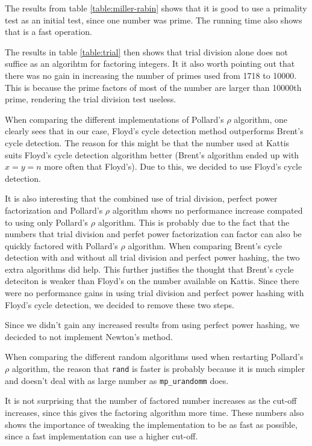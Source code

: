 The results from table \ref{table:miller-rabin} shows that it is good to use 
a primality test as an initial test, since one number was prime.
The running time also shows that is a fast operation.

The results in table \ref{table:trial} then shows that trial division alone 
does not suffice as an algorihtm for factoring integers. It it also worth
pointing out that there was no gain in increasing the number of primes used from
1718 to 10000. This is because the prime factors of most of the number are
larger than 10000th prime, rendering the trial division test useless.

When comparing the different implementations of Pollard's $\rho$ algorithm, one
clearly sees that in our case, Floyd's cycle detection method outperforms
Brent's cycle detection. The reason for this might be that the number used at
Kattis suits Floyd's cycle detection algorithm better (Brent's algorithm ended
up with $x = y = n$ more often that Floyd's). Due to this, we decided to use
Floyd's cycle detection. 

It is also interesting that the combined use of trial
division, perfect power factorization and Pollard's $\rho$ algorithm shows no
performance increase compated to using only Pollard's $\rho$ algorithm.
This is probably due to the fact that the numbers that trial division and
perfet power factorization can factor can also be quickly factored with
Pollard's $\rho$ algorithm. When comparing
Brent's cycle detection with and without all trial division and perfect power
hashing, the two extra algorithms did help. This further justifies the thought
that Brent's cycle deteciton is weaker than Floyd's on the number available on
Kattis. Since there were no performance gains in using trial division and
perfect power hashing with Floyd's cycle detection, we decided to remove these
two steps.

Since we didn't gain any increased results from using perfect power hashing, 
we decicded to not implement Newton's method.

When comparing the different random algorithms used when restarting Pollard's
$\rho$ algorithm, the reason that \texttt{rand} is faster is probably because
it is much simpler and doesn't deal with as large number as
\texttt{mp\_urandomm} does.

It is not surprising that the number of factored number increases as the
cut-off increases, since this gives the factoring algorithm more time. These
numbers also shows the importance of tweaking the implementation to be as fast
as possible, since a fast implementation can use a higher cut-off.
